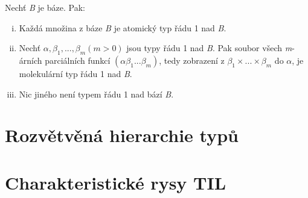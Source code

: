 Nechť \textit{B} je báze. Pak:

\begin{enumerate}[i)]
    \item Každá množina z báze \textit{B} je atomický typ řádu 1 nad \textit{B}.
    \item Nechť $\alpha, \beta_1, ...,\beta_m (m > 0)$ jsou typy řádu 1 nad \textit{B}. Pak soubor
        všech \textit{m}-árních parciálních funkcí $(\alpha\beta_1...\beta_m)$, tedy zobrazení z 
        $\beta_1 \times ... \times \beta_m$ do $\alpha$, je molekulární typ řádu 1 nad \textit{B}.
    \item Nic jiného není typem řádu 1 nad bází \textit{B}.
\end{enumerate}

\section{Rozvětvěná hierarchie typů} \label{type-order}

\section{Charakteristické rysy TIL}

\endinput
